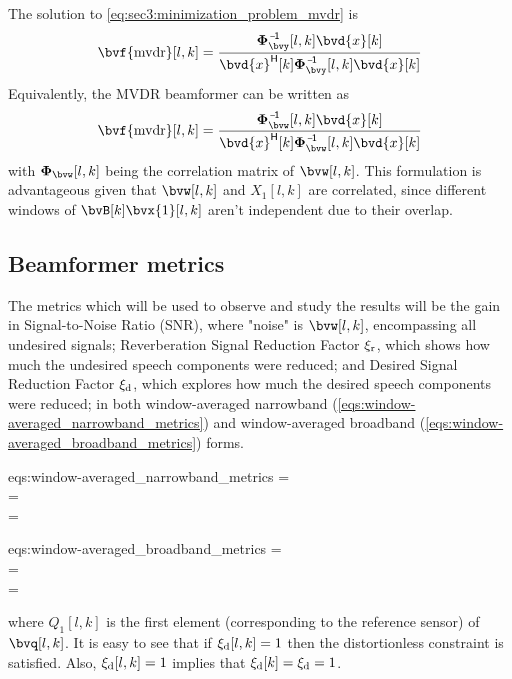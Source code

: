 The solution to \cref{eq:sec3:minimization_problem_mvdr} is
\begin{equation}
	\label{eq:sec3:solution_mvdr_beamformer}
	\bvf{\mvdr}[l,k] = \frac{ \inv{\Corr{\bvy}}[l,k] \bvd{x}[k] }{ \he{\bvd{x}}[k] \inv{\Corr{\bvy}}[l,k] \bvd{x}[k] }
\end{equation}
Equivalently, the MVDR beamformer can be written as
\begin{equation}
	\bvf{\mvdr}[l,k] = \frac{ \inv{\Corr{\bvw}}[l,k] \bvd{x}[k] }{ \he{\bvd{x}}[k] \inv{\Corr{\bvw}}[l,k] \bvd{x}[k] }
\end{equation}
with $\Corr{\bvw}[l,k]$ being the correlation matrix of $\bvw[l,k]$. This formulation is advantageous given that $\bvw[l,k]$ and $X_1[l,k]$ are correlated, since different windows of $\bvB[k] \bvx{1}[l,k]$ aren't independent due to their overlap.

\subsection{Beamformer metrics}

The metrics which will be used to observe and study the results will be the gain in Signal-to-Noise Ratio (SNR), where "noise" is $\bvw[l,k]$, encompassing all undesired signals; Reverberation Signal Reduction Factor $\xi_{\mathrm{r}}$, which shows how much the undesired speech components were reduced; and Desired Signal Reduction Factor $\xi_{\mathrm{d}}$, which explores how much the desired speech components were reduced; in both window-averaged narrowband (\cref{eqs:window-averaged_narrowband_metrics}) and window-averaged broadband (\cref{eqs:window-averaged_broadband_metrics}) forms.
%
\begin{subgather}{eqs:window-averaged_narrowband_metrics}
	\gsnr[k] =  \div {} \\
	\rsrf[k] =  \\
	\dsrf[k] = 
\end{subgather}
\begin{subgather}{eqs:window-averaged_broadband_metrics}
	\gsnr =  \div {} \\
	\rsrf =  \\
	\dsrf = 
\end{subgather}
where $Q_1[l,k]$ is the first element (corresponding to the reference sensor) of $\bvq[l,k]$. It is easy to see that if $\xi_{\mathrm{d}}[l,k] = 1$ then the distortionless constraint is satisfied. Also, $\xi_{\mathrm{d}}[l,k] = 1$ implies that $\xi_{\mathrm{d}}[k] = \xi_{\mathrm{d}} = 1$.